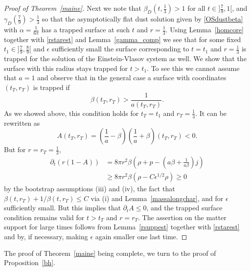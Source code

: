 \documentclass[11pt]{article}
\begin{document}
\begin{proof}[Proof of Theorem~\ref{maine}]
  Next we note that $\beta_D(t,\frac{1}{3}) >1$ for all $t\in]\frac{7}{9},1[$,
  and $\gamma_D(\frac{7}{9}) > \frac{1}{3}$ so that the asymptotically
  flat dust solution given by \eqref{OSdustbeta} with $\alpha=\frac{1}{6\pi}$
  has a trapped surface at such $t$ and $r=\frac{1}{3}$.
  Using Lemma~\ref{homcore} together
  with \eqref{rstarest} and Lemma~\ref{gamma_comp} we see that
  for some fixed $t_1\in ]\frac{7}{9},\frac{8}{9}[$ and $\epsilon$
  sufficiently small
  the surface corresponding to $t=t_1$ and $r=\frac{1}{3}$ is trapped
  for the solution of the Einstein-Vlasov system as well.
  We show that the surface with this radius stays trapped for $t>t_1$.
  To see this we cannot assume that $a=1$ and observe that in the general
  case a surface with coordinates $(t_T,r_T)$ is trapped if
  \[
  \beta(t_T,r_T) > \frac{1}{a(t_T,r_T)}.
  \]
  As we showed above, this condition holds for $t_T=t_1$ and $r_T=\frac{1}{3}$.
  It can be rewritten as
  \[
  A(t_T,r_T) =\left(\frac{1}{a}-\beta\right)
  \left(\frac{1}{a}+\beta\right)(t_T,r_T) < 0.
  \]
  But for $r=r_T=\frac{1}{3}$,
  \begin{align*}
    \partial_t (r(1-A))
    &=
    8 \pi r^2
    \beta \left( \rho + p - \left(a \beta + \frac{1}{a\beta}\right) j\right)\\
    &\geq
    8 \pi r^2 \beta \left(\rho - C \epsilon^{1/2} \rho\right) \geq 0
  \end{align*}
  by the bootstrap assumptions (iii) and (iv), the fact that
  $\beta(t,r_T)+1/\beta(t,r_T) \leq C$ via (i) and Lemma~\ref{massalongchar},
  and for $\epsilon$ sufficiently small.
  But this implies that $\partial_t A \leq 0$,
  and the trapped surface condition remains
  valid for $t>t_T$ and $r=r_T$.
  The assertion on the matter support for large times
  follows from Lemma~\ref{rsuppest} together with \eqref{rstarest}
  and by, if necessary, making $\epsilon$ again smaller one last time.
\end{proof}

The proof of Theorem~\ref{maine} being complete, we turn to the proof
of Proposition~\ref{bh}.
\end{document}
